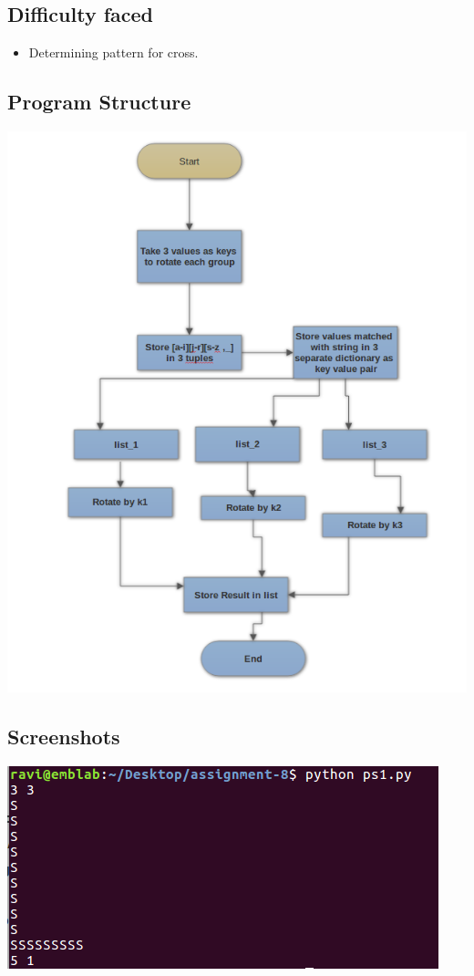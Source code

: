 \documentclass[11pt]{article}
\begin{document}
{{}

\subsection{Difficulty faced}
{
\begin{itemize}
\item Determining pattern for cross.
\end{itemize}
}

\subsection{Program Structure}
\begin{center}
\includegraphics[scale=0.60]{fc2.png}
\end{center}
\newpage


\subsection{Screenshots}
{
\begin{center}
\includegraphics[scale=0.70]{ss1.png}



\end{center}}}
\end{document}

